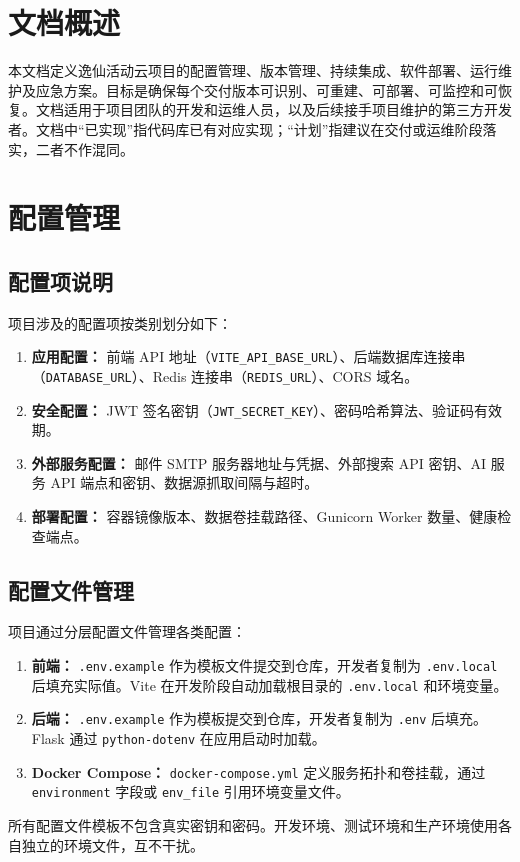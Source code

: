 \documentclass[12pt,a4paper]{ctexart}
\begin{document}
\tableofcontents\clearpage{}

\section{文档概述}
本文档定义逸仙活动云项目的配置管理、版本管理、持续集成、软件部署、运行维护及应急方案。目标是确保每个交付版本可识别、可重建、可部署、可监控和可恢复。文档适用于项目团队的开发和运维人员，以及后续接手项目维护的第三方开发者。文档中“已实现”指代码库已有对应实现；“计划”指建议在交付或运维阶段落实，二者不作混同。

\section{配置管理}
\subsection{配置项说明}
项目涉及的配置项按类别划分如下：
\begin{enumerate}
\item \textbf{应用配置：} 前端 API 地址（\texttt{VITE\_API\_BASE\_URL}）、后端数据库连接串（\texttt{DATABASE\_URL}）、Redis 连接串（\texttt{REDIS\_URL}）、CORS 域名。
\item \textbf{安全配置：} JWT 签名密钥（\texttt{JWT\_SECRET\_KEY}）、密码哈希算法、验证码有效期。
\item \textbf{外部服务配置：} 邮件 SMTP 服务器地址与凭据、外部搜索 API 密钥、AI 服务 API 端点和密钥、数据源抓取间隔与超时。
\item \textbf{部署配置：} 容器镜像版本、数据卷挂载路径、Gunicorn Worker 数量、健康检查端点。
\end{enumerate}

\subsection{配置文件管理}
项目通过分层配置文件管理各类配置：
\begin{enumerate}
\item \textbf{前端：} \texttt{.env.example} 作为模板文件提交到仓库，开发者复制为 \texttt{.env.local} 后填充实际值。Vite 在开发阶段自动加载根目录的 \texttt{.env.local} 和环境变量。
\item \textbf{后端：} \texttt{.env.example} 作为模板提交到仓库，开发者复制为 \texttt{.env} 后填充。Flask 通过 \texttt{python-dotenv} 在应用启动时加载。
\item \textbf{Docker Compose：} \texttt{docker-compose.yml} 定义服务拓扑和卷挂载，通过 \texttt{environment} 字段或 \texttt{env\_file} 引用环境变量文件。
\end{enumerate}
所有配置文件模板不包含真实密钥和密码。开发环境、测试环境和生产环境使用各自独立的环境文件，互不干扰。
\end{document}
